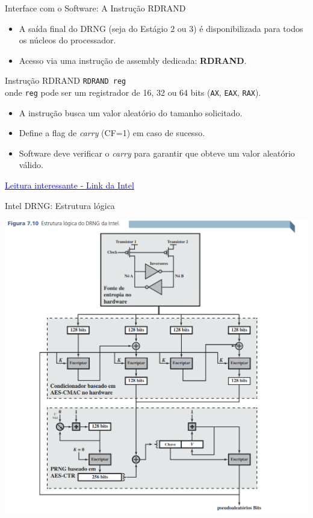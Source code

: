 \begin{frame}{Interface com o Software: A Instrução RDRAND}
    \begin{itemize}
        \item A saída final do DRNG (seja do Estágio 2 ou 3) é disponibilizada para todos os núcleos do processador.
        \item Acesso via uma instrução de assembly dedicada: \textbf{RDRAND}.
    \end{itemize}

    \begin{block}{Instrução RDRAND}
        \texttt{RDRAND reg} \\
        onde \texttt{reg} pode ser um registrador de 16, 32 ou 64 bits (\texttt{AX}, \texttt{EAX}, \texttt{RAX}).
        \begin{itemize}
            \item A instrução busca um valor aleatório do tamanho solicitado.
            \item Define a flag de \emph{carry} (CF=1) em caso de sucesso.
            \item Software deve verificar o \emph{carry} para garantir que obteve um valor aleatório válido.
        \end{itemize}
    \end{block}


    \href{https://www.intel.com/content/www/us/en/developer/articles/guide/intel-digital-random-number-generator-drng-software-implementation-guide.html}{\textcolor{blue}{Leitura interessante - Link da Intel}}
\end{frame}

\begin{frame}{Intel DRNG: Estrutura lógica}

    \centering
    \includegraphics[width=0.55\linewidth]{Figuras/estrutura-logica-drng-intel.png}




\end{frame}

